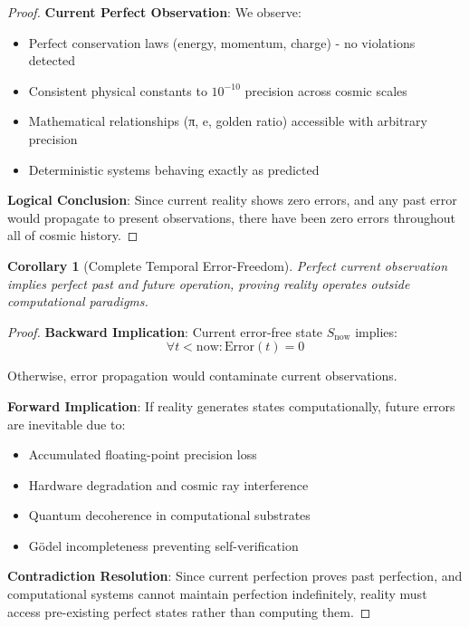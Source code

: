 \documentclass[12pt,a4paper]{article}
\newtheorem{corollary}[theorem]{Corollary}
\begin{document}
\begin{proof}
\textbf{Current Perfect Observation}: We observe:
\begin{itemize}
    \item Perfect conservation laws (energy, momentum, charge) - no violations detected
    \item Consistent physical constants to $10^{-10}$ precision across cosmic scales
    \item Mathematical relationships (π, e, golden ratio) accessible with arbitrary precision
    \item Deterministic systems behaving exactly as predicted
\end{itemize}

\textbf{Logical Conclusion}: Since current reality shows zero errors, and any past error would propagate to present observations, there have been zero errors throughout all of cosmic history.
\end{proof}

\begin{corollary}[Complete Temporal Error-Freedom]
Perfect current observation implies perfect past and future operation, proving reality operates outside computational paradigms.
\end{corollary}

\begin{proof}
\textbf{Backward Implication}: Current error-free state $S_{\text{now}}$ implies:
$$\forall t < \text{now}: \text{Error}(t) = 0$$

Otherwise, error propagation would contaminate current observations.

\textbf{Forward Implication}: If reality generates states computationally, future errors are inevitable due to:
\begin{itemize}
    \item Accumulated floating-point precision loss
    \item Hardware degradation and cosmic ray interference  
    \item Quantum decoherence in computational substrates
    \item Gödel incompleteness preventing self-verification
\end{itemize}

\textbf{Contradiction Resolution}: Since current perfection proves past perfection, and computational systems cannot maintain perfection indefinitely, reality must access pre-existing perfect states rather than computing them.
\end{proof}
\end{document}
